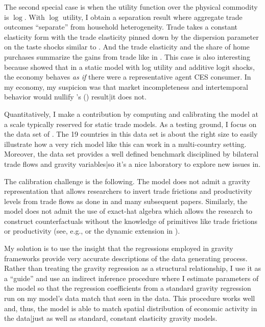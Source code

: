 \documentclass[12pt,pdftex]{article}
\def\citeapos#1{\citeauthor{#1}'s (\citeyear{#1})}
\begin{document}
\begin{onehalfspacing}
The second special case is when the utility function over the physical commodity is $\log$. With $\log$ utility, I obtain a separation result where aggregate trade outcomes ``separate'' from household heterogeneity. Trade takes a constant elasticity form with the trade elasticity pinned down by the dispersion parameter on the taste shocks similar to \citet{eaton2002technology}. And the trade elasticity and the share of home purchases summarize the gains from trade like in \citet{arkolakis2012new}. This case is also interesting because \citet*{anderson1987ces} showed that in a static model with log utility and additive logit shocks, the economy behaves \emph{as if} there were a representative agent CES consumer. In my economy, my suspicion was that market incompleteness and intertemporal behavior would nullify \citeapos{anderson1987ces} result|it does not.

Quantitatively, I make a contribution by computing and calibrating the model at a scale typically reserved for static trade models. As a testing ground, I focus on the data set of \citet{eaton2002technology}. The 19 countries in this data set is about the right size to easily illustrate how a very rich model like this can work in a multi-country setting. Moreover, the \citet{eaton2002technology} data set provides a well defined benchmark disciplined by bilateral trade flows and gravity variables|so it's a nice laboratory to explore new issues in.

The calibration challenge is the following. The model does not admit a gravity representation that allows researchers to invert trade frictions and productivity levels from trade flows as done in \citet{eaton2002technology} and many subsequent papers. Similarly, the model does not admit the use of exact-hat algebra which allows the research to construct counterfactuals without the knowledge of primitives like trade frictions or productivity (see, e.g., \citet{costinot2014trade} or the dynamic extension in \citet*{caliendo2015trade}).

My solution is to use the insight that the regressions employed in gravity frameworks provide very accurate descriptions of the data generating process. Rather than treating the gravity regression as a structural relationship, I use it as a ``guide'' and use an indirect inference procedure where I estimate parameters of the model so that the regression coefficients from a standard gravity regression run on my model's data match that seen in the data. This procedure works well and, thus, the model is able to match spatial distribution of economic activity in the data|just as well as standard, constant elasticity gravity models.


\end{onehalfspacing}
\end{document}
